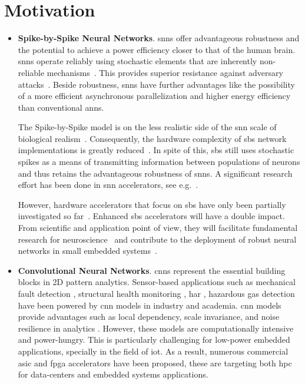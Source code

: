 \section{Motivation}\label{chap1.motivation}


\begin{itemize}

\item \textbf{Spike-by-Spike Neural Networks}. \glspl{snn} offer advantageous robustness and the potential to achieve a power efficiency closer to that of the human brain. \glspl{snn} operate reliably using stochastic elements that are inherently non-reliable mechanisms~\cite{mcdonnell2011benefits}. This provides superior resistance against adversary attacks~\cite{ernst2007efficient, Dapello2020.06.16.154542}. Beside robustness, \glspl{snn} have further advantages like the possibility of a more efficient asynchronous parallelization and higher energy efficiency than conventional \glspl{ann}.

The Spike-by-Spike model is on the less realistic side of the \gls{snn} scale of biological realism~\cite{rotermund2019Backpropagation,ernst2007efficient}. Consequently, the hardware complexity of \gls{sbs} network implementations is greatly reduced~\cite{rotermund2018massively}. In spite of this, \gls{sbs} still uses stochastic spikes as a means of transmitting information between populations of neurons and thus retains the advantageous robustness of \glspl{snn}. A significant research effort has been done in \gls{snn} accelerators, see e.g.~\cite{roy2019towards,bouvier2019spiking,
	young2019review,TrueNorth_Trans15,Spinnaker_Trans13,davies2018loihi}.

However, hardware accelerators that focus on \gls{sbs} have only been partially investigated so far~\cite{rotermund2018massively}. Enhanced \gls{sbs} accelerators will have a double impact. From scientific and application point of view, they will facilitate fundamental research for neuroscience~\cite{ernst2007efficient,rotermund2019recurrentsbs, dayan2001theoretical} and contribute to the deployment of robust neural networks in small embedded systems~\cite{nevarez2020accelerator}.

\item \textbf{Convolutional Neural Networks}. \glspl{cnn} represent the essential building blocks in 2D pattern analytics. Sensor-based applications such as mechanical fault detection \cite{li2019sensor,dong2018rolling}, structural health monitoring \cite{nagayama2007structural}, \gls{har} \cite{wang2019deep}, hazardous gas detection \cite{kim2017hazardous} have been powered by \gls{cnn} models in industry and academia. \gls{cnn} models provide advantages such as local dependency, scale invariance, and noise resilience in analytics \cite{du2014leveraging}. However, these models are computationally intensive and power-hungry. This is particularly challenging for low-power embedded applications, specially in the field of \gls{iot}. As a result, numerous commercial \gls{asic} and \gls{fpga} accelerators have been proposed, these are targeting both \gls{hpc} for data-centers and embedded systems applications.


\end{itemize}
